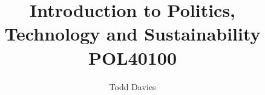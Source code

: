 \newcommand{\coursename}{Introduction to Politics, Technology and Sustainability}
\newcommand{\coursecode}{POL40100}
\newcommand{\courseinfo}{}
\newcommand{\Author}{Todd Davies} 
\newcommand{\Title}{Introduction to Politics, Technology and Sustainability\\POL40100}
\author{\Author}
\title{\Title}
